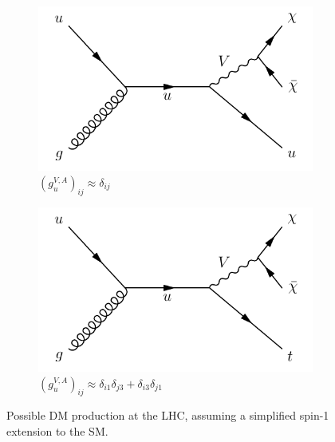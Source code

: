 \begin{figure}[]
    \begin{center}
        \begin{subfigure}[t]{0.49\textwidth}
            \includegraphics[width=\textwidth]{figures/monotop/diagrams/mj.pdf}
            \caption{$(g_{u}^{V,A})_{ij} \approx \delta_{ij}$}
            \label{fig:mt:fcncdiaga}
        \end{subfigure}
        \begin{subfigure}[t]{0.49\textwidth}
            \includegraphics[width=\textwidth]{figures/monotop/diagrams/fcncb.pdf}
            \caption{$(g_{u}^{V,A})_{ij} \approx \delta_{i1}\delta_{j3} + \delta_{i3}\delta_{j1}$}
            \label{fig:mt:fcncdiagb}
        \end{subfigure}
        \caption{Possible DM production at the LHC, assuming a simplified spin-1 extension to the SM.}
        \label{fig:mt:fcncdiag}
    \end{center}
\end{figure}

